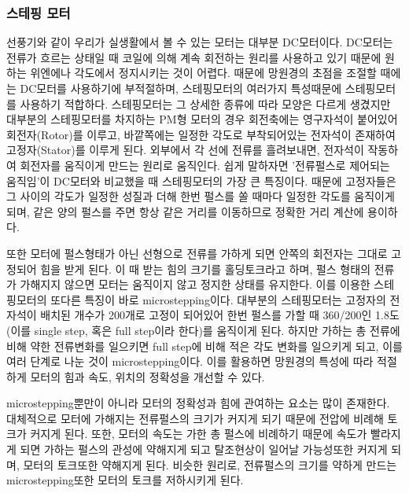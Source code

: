 \subsubsection{스테핑 모터}


선풍기와 같이 우리가 실생활에서 볼 수 있는 모터는 대부분 DC모터이다. DC모터는 전류가 흐르는 상태일 때 코일에 의해 계속 회전하는 원리를 사용하고 있기 때문에 원하는 위엔에나 각도에서 정지시키는 것이 어렵다. 때문에 망원경의 초점을 조절할 때에는 DC모터를 사용하기에 부적절하며, 스테핑모터의 여러가지 특성때문에 스테핑모터를 사용하기 적합하다.
스테핑모터는 그 상세한 종류에 따라 모양은 다르게 생겼지만 대부분의 스테핑모터를 차지하는 PM형 모터의 경우 회전축에는 영구자석이 붙어있어 회전자(Rotor)를 이루고, 바깥쪽에는 일정한 각도로 부착되어있는 전자석이 존재하여 고정자(Stator)를 이루게 된다. 외부에서 각 선에 전류를 흘려보내면, 전자석이 작동하여 회전자를 움직이게 만드는 원리로 움직인다. 쉽게 말하자면 '전류펄스로 제어되는 움직임'이 DC모터와 비교했을 때 스테핑모터의 가장 큰 특징이다. 때문에 고정자들은 그 사이의 각도가 일정한 성질과 더해 한번 펄스를 쏠 때마다 일정한 각도를 움직이게 되며, 같은 양의 펄스를 주면 항상 같은 거리를 이동하므로 정확한 거리 계산에 용이하다.

또한 모터에 펄스형태가 아닌 선형으로 전류를 가하게 되면 안쪽의 회전자는 그대로 고정되어 힘을 받게 된다. 이 때 받는 힘의 크기를 홀딩토크라고 하며, 펄스 형태의 전류가 가해지지 않으면 모터는 움직이지 않고 정지한 상태를 유지한다. 이를 이용한 스테핑모터의 또다른 특징이 바로 microstepping이다. 대부분의 스테핑모터는 고정자의 전자석이 배치된 개수가 200개로 고정이 되어있어 한번 펄스를 가할 때 360/200인 1.8도(이를 single step, 혹은 full step이라 한다)를 움직이게 된다. 하지만 가하는 총 전류에 비해 약한 전류변화를 일으키면 full step에 비해 적은 각도 변화를 일으키게 되고, 이를 여러 단계로 나눈 것이 microstepping이다. 이를 활용하면 망원경의 특성에 따라 적절하게 모터의 힘과 속도, 위치의 정확성을 개선할 수 있다.

microstepping뿐만이 아니라 모터의 정확성과 힘에 관여하는 요소는 많이 존재한다. 대체적으로  모터에 가해지는 전류펄스의 크기가 커지게 되기 때문에 전압에 비례해 토크가 커지게 된다. 또한, 모터의 속도는 가한 총 펄스에 비례하기 때문에 속도가 빨라지게 되면 가하는 펄스의 관성에 약해지게 되고 탈조현상이 일어날 가능성또한 커지게 되며, 모터의 토크또한 약해지게 된다. 비슷한 원리로, 전류펄스의 크기를 약하게 만드는 microstepping또한 모터의 토크를 저하시키게 된다.



